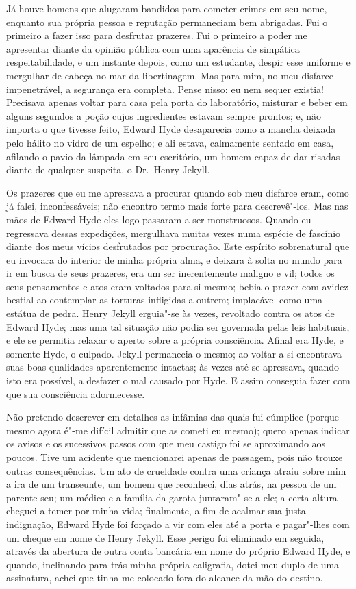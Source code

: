 Já houve homens que alugaram bandidos para cometer crimes em seu nome,
enquanto sua própria pessoa e reputação permaneciam bem abrigadas.  Fui
o primeiro a fazer isso para desfrutar prazeres.  Fui o primeiro a
poder me apresentar diante da opinião pública com uma aparência de
simpática respeitabilidade, e um instante depois, como um estudante,
despir esse uniforme e mergulhar de cabeça no mar da libertinagem.  Mas
para mim, no meu disfarce impenetrável, a segurança era completa. 
Pense nisso: eu nem sequer existia!  Precisava apenas voltar para casa
pela porta do laboratório, misturar e beber em alguns segundos a poção
cujos ingredientes estavam sempre prontos; e, não importa o que tivesse
feito, Edward Hyde desaparecia como a mancha deixada pelo hálito no
vidro de um espelho; e ali estava, calmamente sentado em casa, afilando
o pavio da lâmpada em seu escritório, um homem capaz de dar risadas
diante de qualquer suspeita, o Dr.~Henry Jekyll.

Os prazeres que eu me apressava a procurar quando sob meu disfarce eram,
como já falei, inconfessáveis; não encontro termo mais forte para
descrevê"-los.  Mas nas mãos de Edward Hyde eles logo passaram a ser
monstruosos.  Quando eu regressava dessas expedições, mergulhava muitas
vezes numa espécie de fascínio diante dos meus vícios desfrutados por
procuração. Este  espírito sobrenatural que eu invocara do interior de
minha própria alma, e deixara à solta no mundo para ir em busca de seus
prazeres, era um ser inerentemente maligno e vil; todos os seus
pensamentos e atos eram voltados para si mesmo; bebia o prazer com
avidez bestial ao contemplar as torturas infligidas a outrem;
implacável como uma estátua de pedra.  Henry Jekyll erguia"-se às vezes,
revoltado contra os atos de Edward Hyde; mas uma tal situação não podia
ser governada pelas leis habituais, e ele se permitia relaxar o aperto
sobre a própria consciência.  Afinal era Hyde, e somente Hyde, o culpado.  
Jekyll permanecia o mesmo; ao voltar a si encontrava suas
boas qualidades aparentemente intactas; às vezes até se apressava,
quando isto era possível, a desfazer o mal causado por Hyde.  E assim
conseguia fazer com que sua consciência adormecesse.

Não pretendo descrever em detalhes as infâmias das quais fui cúmplice
(porque mesmo agora é"-me difícil admitir que as cometi eu mesmo); quero
apenas indicar os avisos e os sucessivos passos com que meu castigo foi
se aproximando aos poucos.  Tive um acidente que mencionarei apenas de
passagem, pois não trouxe outras consequências.  Um ato de crueldade
contra uma criança atraiu sobre mim a ira de um transeunte, um homem
que reconheci, dias atrás, na pessoa de um parente seu; um médico e a
família da garota juntaram"-se a ele; a certa altura cheguei a temer por
minha vida; finalmente, a fim de acalmar sua justa indignação, Edward
Hyde foi forçado a vir com eles até a porta e pagar"-lhes com um cheque
em nome de Henry Jekyll.  Esse perigo foi eliminado em seguida, através
da abertura de outra conta bancária em nome do próprio Edward Hyde, e
quando, inclinando para trás minha própria caligrafia, dotei meu duplo
de uma assinatura, achei que tinha me colocado fora do alcance da mão
do destino.


